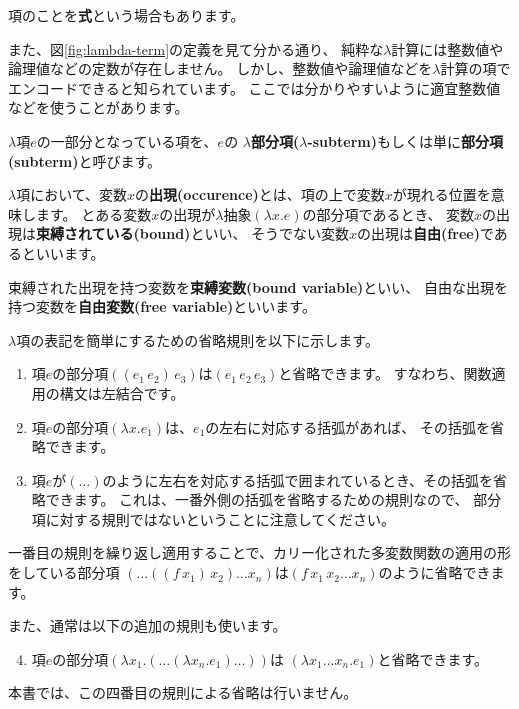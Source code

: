 項のことを\textbf{式}という場合もあります。

また、図\ref{fig:lambda-term}の定義を見て分かる通り、
純粋な$\lambda$計算には整数値や論理値などの定数が存在しません。
しかし、整数値や論理値などを$\lambda$計算の項でエンコードできると知られています。
ここでは分かりやすいように適宜整数値などを使うことがあります。

$\lambda$項$e$の一部分となっている項を、$e$の
\textbf{$\lambda$部分項($\lambda$-subterm)}もしくは単に\textbf{部分項(subterm)}と呼びます。

$\lambda$項において、変数$x$の\textbf{出現(occurence)}とは、項の上で変数$x$が現れる位置を意味します。
とある変数$x$の出現が$\lambda$抽象$(\lambda x . e)$の部分項であるとき、
変数$x$の出現は\textbf{束縛されている(bound)}といい、
そうでない変数$x$の出現は\textbf{自由(free)}であるといいます。

束縛された出現を持つ変数を\textbf{束縛変数(bound variable)}といい、
自由な出現を持つ変数を\textbf{自由変数(free variable)}といいます。

$\lambda$項の表記を簡単にするための省略規則を以下に示します。

\begin{enumerate}
  \item 項$e$の部分項$((e_1 \, e_2) \, e_3)$は$(e_1 \, e_2 \, e_3)$と省略できます。
        すなわち、関数適用の構文は左結合です。
  \item 項$e$の部分項$(\lambda x . e_1)$は、$e_1$の左右に対応する括弧があれば、
        その括弧を省略できます。
  \item 項$e$が$(\dots)$のように左右を対応する括弧で囲まれているとき、その括弧を省略できます。
        これは、一番外側の括弧を省略するための規則なので、
        部分項に対する規則ではないということに注意してください。
\end{enumerate}

一番目の規則を繰り返し適用することで、カリー化された多変数関数の適用の形をしている部分項
$(\dots((f \, x_1) \, x_2) \dots x_n)$は$(f \, x_1 \, x_2 \dots x_n)$のように省略できます。

また、通常は以下の追加の規則も使います。

\begin{enumerate}
  \setcounter{enumi}{3}
  \item 項$e$の部分項$(\lambda x_1. (\dots (\lambda x_n . e_1) \dots))$は
       $(\lambda x_1 \dots x_n . e_1)$と省略できます。
\end{enumerate}

本書では、この四番目の規則による省略は行いません。


